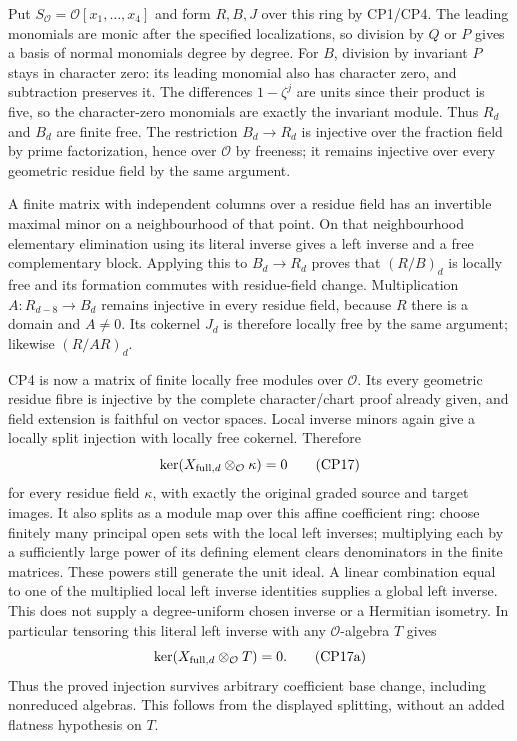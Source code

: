 \documentclass[11pt]{article}
\begin{document}
Put $S_{\mathcal O}=\mathcal O[x_1,\ldots,x_4]$ and form $R,B,J$
over this ring by CP1/CP4. The leading monomials are monic after the
specified localizations, so division by $Q$ or $P$ gives a basis of
normal monomials degree by degree. For $B$, division by invariant
$P$ stays in character zero: its leading monomial also has character
zero, and subtraction preserves it. The differences $1-\zeta^j$ are
units since their product is five, so the character-zero monomials
are exactly the invariant module. Thus $R_d$ and $B_d$ are finite free.
The restriction $B_d\to R_d$ is injective over the fraction field
by prime factorization, hence over $\mathcal O$ by freeness; it remains
injective over every geometric residue field by the same argument.

A finite matrix with independent columns over a residue field has
an invertible maximal minor on a neighbourhood of that point. On
that neighbourhood elementary elimination using its literal inverse
gives a left inverse and a free complementary block. Applying this
to $B_d\to R_d$ proves that $(R/B)_d$ is locally free and its
formation commutes with residue-field change. Multiplication
$A:R_{d-8}\to B_d$ remains injective in every residue field, because
$R$ there is a domain and $A\ne0$. Its cokernel $J_d$ is therefore
locally free by the same argument; likewise $(R/AR)_d$.

CP4 is now a matrix of finite locally free modules over $\mathcal O$.
Its every geometric residue fibre is injective by the complete
character/chart proof already given, and field extension is faithful
on vector spaces. Local inverse minors again give a locally split
injection with locally free cokernel. Therefore
\[
 \ker(X_{{\rm full},d}\otimes_{\mathcal O}\kappa)=0                \tag{CP17}
\]
for every residue field $\kappa$, with exactly the original graded
source and target images. It also splits as a module map over this
affine coefficient ring: choose finitely many principal open sets
with the local left inverses; multiplying each by a sufficiently
large power of its defining element clears denominators in the
finite matrices. These powers still generate the unit ideal.
A linear combination equal to one of the multiplied local left
inverse identities supplies a global left inverse. This does not
supply a degree-uniform chosen inverse or a Hermitian isometry.
In particular tensoring this literal left inverse with any
$\mathcal O$-algebra $T$ gives
\[
 \ker(X_{{\rm full},d}\otimes_{\mathcal O}T)=0.\tag{CP17a}
\]
Thus the proved injection survives arbitrary coefficient base change,
including nonreduced algebras. This follows from the displayed splitting,
without an added flatness hypothesis on $T$.
\end{document}
